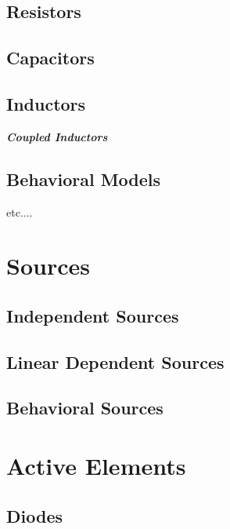 \subsection{Resistors}
\label{subsec_sceadm_resistors}

\subsection{Capacitors}
\label{subsec_sceadm_capacitors}

\subsection{Inductors}
\label{subsec_sceadm_inductors}

\textit{\textbf{Coupled Inductors}}

\subsection{Behavioral Models}
\label{subsec_sceadm_behavioralmodels}

{\Large etc....}

\section{Sources}
\label{sec_sceadm_sources}

\subsection{Independent Sources}
\label{subsec_sceadm_independentsources}

\subsection{Linear Dependent Sources}
\label{subsec_sceadm_lineardependentsources}

\subsection{Behavioral Sources}
\label{subsec_sceadm_behavioralsources}



\section{Active Elements}
\label{sec_sceadm_activeelements}

\subsection{Diodes}
\label{subsec_sceadm_diodes}

